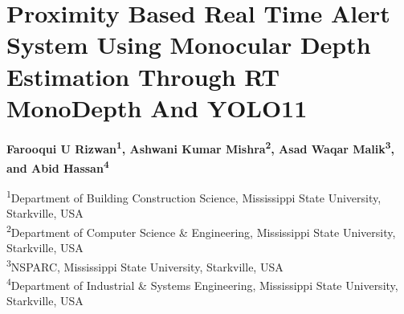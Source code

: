 \section*{Proximity Based Real Time Alert System Using Monocular Depth Estimation Through RT MonoDepth And YOLO11}

\textbf{Farooqui U Rizwan\textsuperscript{1}, Ashwani Kumar Mishra\textsuperscript{2}, Asad Waqar Malik\textsuperscript{3}, and Abid Hassan\textsuperscript{4}}

\vspace{0.5cm}
\footnotesize{
\noindent
\textsuperscript{1}Department of Building Construction Science, Mississippi State University, Starkville, USA\\
\textsuperscript{2}Department of Computer Science \& Engineering, Mississippi State University, Starkville, USA\\
\textsuperscript{3}NSPARC, Mississippi State University, Starkville, USA\\
\textsuperscript{4}Department of Industrial \& Systems Engineering, Mississippi State University, Starkville, USA
}
\vspace{0.5cm}

